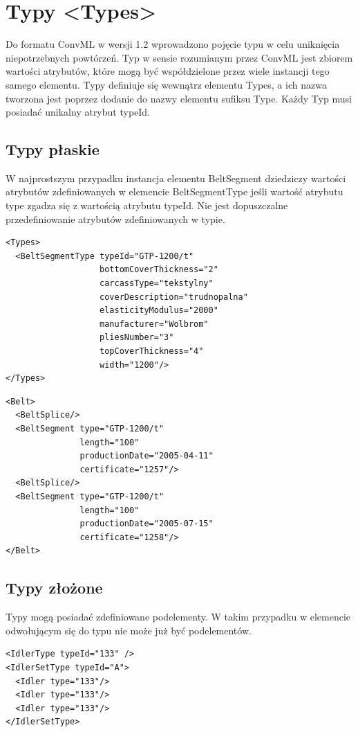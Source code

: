 \documentclass[12pt,a4paper]{article}
\begin{document}
\section{Typy <Types>}
Do formatu ConvML w wersji 1.2 wprowadzono pojęcie typu w celu uniknięcia
niepotrzebnych powtórzeń.  Typ w sensie rozumianym przez ConvML jest zbiorem
wartości atrybutów, które mogą być współdzielone przez wiele instancji tego
samego elementu.  Typy definiuje się wewnątrz elementu Types, a ich nazwa
tworzona jest poprzez dodanie do nazwy elementu sufiksu Type. Każdy Typ musi
posiadać unikalny atrybut typeId.


\subsection{Typy płaskie}
W najprostszym przypadku instancja elementu BeltSegment dziedziczy wartości
atrybutów zdefiniowanych w elemencie BeltSegmentType jeśli wartość atrybutu type
zgadza się z wartością atrybutu typeId.  Nie jest dopuszczalne przedefiniowanie
atrybutów zdefiniowanych w typie.

\begin{verbatim}
<Types>
  <BeltSegmentType typeId="GTP-1200/t"
                   bottomCoverThickness="2"
                   carcassType="tekstylny"
                   coverDescription="trudnopalna"
                   elasticityModulus="2000"
                   manufacturer="Wolbrom"
                   pliesNumber="3"
                   topCoverThickness="4"
                   width="1200"/>
</Types>
\end{verbatim}

\begin{verbatim}
<Belt>
  <BeltSplice/>
  <BeltSegment type="GTP-1200/t"
               length="100"
               productionDate="2005-04-11"
               certificate="1257"/>
  <BeltSplice/>
  <BeltSegment type="GTP-1200/t"
               length="100"
               productionDate="2005-07-15"
               certificate="1258"/>
</Belt>
\end{verbatim}


\subsection{Typy złożone}
Typy mogą posiadać zdefiniowane podelementy.  W takim przypadku w elemencie
odwołującym się do typu nie może już być podelementów.

\begin{verbatim}
<IdlerType typeId="133" />
<IdlerSetType typeId="A">
  <Idler type="133"/>
  <Idler type="133"/>
  <Idler type="133"/>
</IdlerSetType>
\end{verbatim}
\end{document}

